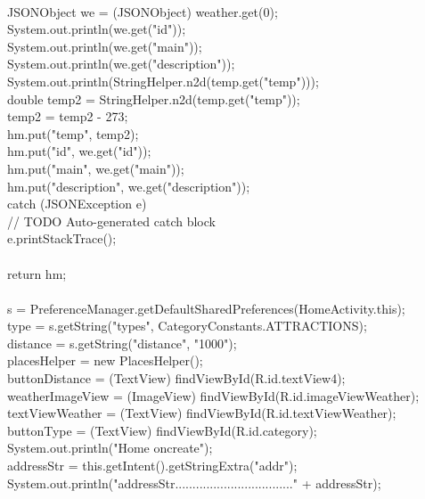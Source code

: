 \documentclass[12pt,a4paper]{article}
\begin{document}
{{{{\\
			JSONObject we = (JSONObject) weather.get(0);\\
			System.out.println(we.get("id"));\\
			System.out.println(we.get("main"));\\
			System.out.println(we.get("description"));\\
			System.out.println(StringHelper.n2d(temp.get("temp")));\\
			double temp2 = StringHelper.n2d(temp.get("temp"));\\
			temp2 = temp2 - 273;\\
			hm.put("temp", temp2);\\
			hm.put("id", we.get("id"));\\
			hm.put("main", we.get("main"));\\
			hm.put("description", we.get("description"));\\

		} catch (JSONException e) {\\
			// TODO Auto-generated catch block\\
			e.printStackTrace();\\
		}\\
		return hm;\\
	}\\
		s = PreferenceManager.getDefaultSharedPreferences(HomeActivity.this);\\
		type = s.getString("types", CategoryConstants.ATTRACTIONS);\\
		distance = s.getString("distance", "1000");\\
		placesHelper = new PlacesHelper();\\
		buttonDistance = (TextView) findViewById(R.id.textView4);\\
		weatherImageView = (ImageView) findViewById(R.id.imageViewWeather);\\
		textViewWeather = (TextView) findViewById(R.id.textViewWeather);\\

		buttonType = (TextView) findViewById(R.id.category);\\
		System.out.println("Home oncreate");\\
		addressStr = this.getIntent().getStringExtra("addr");\\

		System.out.println("addressStr.................................."
				+ addressStr);\\
}\\
\\

}
\end{document}
